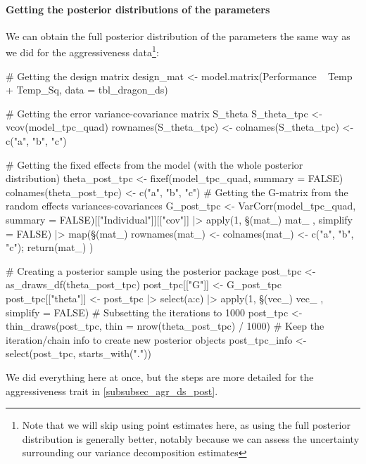 \documentclass[a4paper,12pt,twoside]{article}
\begin{document}
\paragraph{Getting the posterior distributions of the parameters}
We can obtain the full posterior distribution of the parameters the same way as we did for the aggressiveness data\footnote{Note that we will skip using point estimates here, as using the full posterior distribution is generally better, notably because we can assess the uncertainty surrounding our variance decomposition estimates}:
\begin{Rinput}
# Getting the design matrix
design_mat <- model.matrix(Performance ~ Temp + Temp_Sq, data = tbl_dragon_ds)

# Getting the error variance-covariance matrix S_theta
S_theta_tpc <- vcov(model_tpc_quad)
rownames(S_theta_tpc) <- colnames(S_theta_tpc) <- c("a", "b", "c")

# Getting the fixed effects from the model (with the whole posterior distribution)
theta_post_tpc <- fixef(model_tpc_quad, summary = FALSE)
colnames(theta_post_tpc) <- c("a", "b", "c")
# Getting the G-matrix from the random effects variances-covariances 
G_post_tpc <-
    VarCorr(model_tpc_quad, summary = FALSE)[["Individual"]][["cov"]] |>
    apply(1, \§§(mat_) { mat_ }, simplify = FALSE) |>
    map(\§§(mat_) { rownames(mat_) <- colnames(mat_) <- c("a", "b", "c"); return(mat_) })

# Creating a posterior sample using the posterior package
post_tpc <- as_draws_df(theta_post_tpc)
post_tpc[["G"]] <- G_post_tpc
post_tpc[["theta"]] <-
    post_tpc |>
    select(a:c) |>
    apply(1, \§§(vec_) { vec_ }, simplify = FALSE)
# Subsetting the iterations to 1000
post_tpc <- thin_draws(post_tpc, thin = nrow(theta_post_tpc) / 1000)
# Keep the iteration/chain info to create new posterior objects
post_tpc_info <- select(post_tpc, starts_with("."))
\end{Rinput}
We did everything here at once, but the steps are more detailed for the aggressiveness trait in \autoref{subsubsec_agr_ds_post}.
\end{document}
